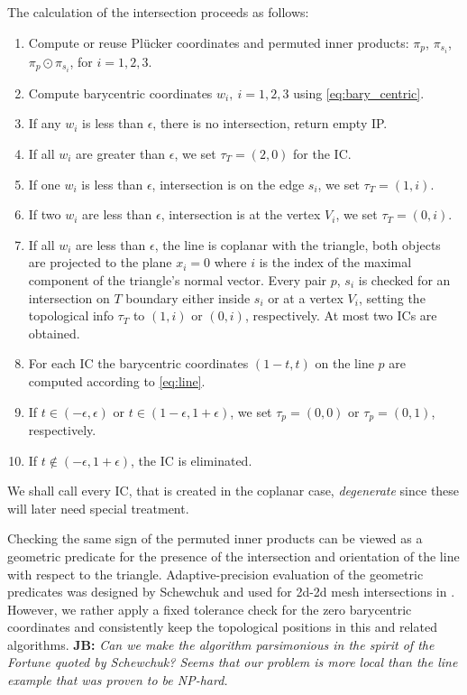 \documentclass{elsarticle}
\newcommand{\noteJB}[1]{{\color{Blue} \textbf{JB: } \textit{#1}}}
\newcommand{\plucker}{Pl\"{u}cker }
\begin{document}
The calculation of the intersection proceeds as follows:
\begin{enumerate}
    \item Compute or reuse \plucker coordinates and permuted inner products: $\pi_p$, $\pi_{s_i}$, $\pi_p \odot \pi_{s_i}$, for $i=1,2,3$.
    \item Compute barycentric coordinates $w_i,\ i=1,2,3$ using \eqref{eq:bary_centric}.
    \item If any $w_i$ is less than $\epsilon$, there is no intersection, return empty IP.  
    \item If all $w_i$ are greater than $\epsilon$, we set $\tau_T = (2, 0)$ for the IC.
    \item If one $w_i$ is less than $\epsilon$, intersection is on the edge $s_i$, we set $\tau_T =(1,i)$.
    \item If two $w_i$ are less than $\epsilon$, intersection is at the vertex $V_i$, we set $\tau_T=(0,i)$.
    \item \label{item:coplanar} If all $w_i$ are less than $\epsilon$, the line is coplanar with the triangle, both objects are 
        projected to the plane $x_i=0$ where $i$ is the index of the maximal component of the triangle's normal vector.
        Every pair $p$, $s_i$ is checked for an intersection on $T$ boundary either inside $s_i$ or at a vertex $V_i$, setting the topological info $\tau_T$ to 
        $(1, i)$ or $(0, i)$, respectively. At most two ICs are obtained.
    \item For each IC the barycentric coordinates $(1-t, t)$ on the line $p$ are computed according to \eqref{eq:line}. 
    \item If $t\in (-\epsilon, \epsilon)$ or $t\in (1-\epsilon, 1+\epsilon)$, we set $\tau_p = (0,0)$ or $\tau_p = (0,1)$, respectively.
    \item If $t\notin (-\epsilon, 1+\epsilon)$, the IC is eliminated.
\end{enumerate}

We shall call every IC, that is created in the coplanar case, \emph{degenerate} since these will later need special treatment.

Checking the same sign of the permuted inner products can be viewed as a geometric predicate for the presence of the intersection and orientation of the 
line with respect to the triangle. Adaptive-precision evaluation of the geometric predicates was designed by Schewchuk \cite{shewchuk_adaptive_1997}
and used for 2d-2d mesh intersections in \cite{elsheikh_reliable_2012}. However, we rather apply a fixed tolerance check for the zero 
barycentric coordinates and consistently keep the topological positions in this and related algorithms. \noteJB{Can we make the algorithm 
\emph{parsimonious} in the spirit of the Fortune \cite{fortune_stable_1989} quoted by Schewchuk? 
Seems that our problem is more local than the line example that was proven to be NP-hard.}
\end{document}
